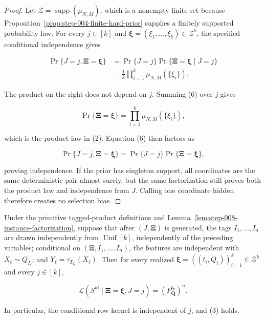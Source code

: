 \begin{proof}
Let \(\mathcal Z=\operatorname{supp}(\mu_{N,M})\), which is a nonempty
finite set because Proposition~\ref{prop:step-004-finite-hard-prior}
supplies a finitely supported
probability law. For every \(j\in[k]\) and
\(\boldsymbol\xi=(\xi_1,\ldots,\xi_k)\in\mathcal Z^k\), the specified
conditional independence gives

\[
\begin{aligned}
\Pr\{J=j,\boldsymbol\Xi=\boldsymbol\xi\}
&=\Pr\{J=j\}
  \Pr\{\boldsymbol\Xi=\boldsymbol\xi\mid J=j\}\\
&=\frac1k\prod_{i=1}^k\mu_{N,M}(\{\xi_i\}).
\end{aligned}
\tag{6}
\]

The product on the right does not depend on \(j\). Summing (6) over
\(j\) gives

\[
\Pr\{\boldsymbol\Xi=\boldsymbol\xi\}
=\prod_{i=1}^k\mu_{N,M}(\{\xi_i\}),
\]

which is the product law in (2). Equation (6) then factors as

\[
\Pr\{J=j,\boldsymbol\Xi=\boldsymbol\xi\}
=\Pr\{J=j\}\Pr\{\boldsymbol\Xi=\boldsymbol\xi\},
\]

proving independence. If the prior has singleton support, all coordinates
are the same deterministic pair almost surely, but the same factorization
still proves both the product law and independence from \(J\). Calling one
coordinate hidden therefore creates no selection bias. \end{proof}

\begin{lemma}\label{lem:step-008-ideal-sample-law}
Under the primitive tagged-product definitions and
Lemma~\ref{lem:step-008-instance-factorization}, suppose that after
\((J,\boldsymbol\Xi)\) is generated, the tags
\(I_1,\ldots,I_n\) are drawn independently from
\(\operatorname{Unif}[k]\), independently of the preceding variables;
conditional on \((\boldsymbol\Xi,I_1,\ldots,I_n)\), the features are
independent with \(X_\ell\sim Q_{I_\ell}\); and
\(Y_\ell=\tau_{T_{I_\ell}}(X_\ell)\). Then for every realized
\(\boldsymbol\xi=((t_i,Q_i))_{i=1}^k\in\mathcal Z^k\) and every
\(j\in[k]\),

\[
\mathcal L\!\left(S^{\mathrm{id}}\mid
  \boldsymbol\Xi=\boldsymbol\xi,J=j\right)
=\left(P_{\boldsymbol Q}^{c_{\boldsymbol t}}\right)^n.
\tag{7}
\]

In particular, the conditional row kernel is independent of \(j\), and (3)
holds.
\end{lemma}

